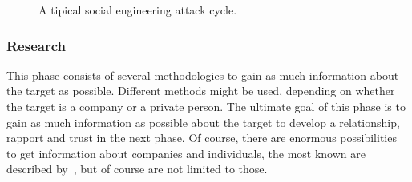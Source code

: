 \begin{figure}
  \begin{center}

    \caption{A tipical social engineering attack cycle.}
  \end{center}
\end{figure}

\subsubsection{Research}

This phase consists of several methodologies to gain as much information about
the target as possible. Different methods might be used, depending on whether
the target is a company or a private person. The ultimate goal of this phase is
to gain as much information as possible about the target to develop a
relationship, rapport and trust in the next phase. Of course, there are
enormous possibilities to get information about companies and individuals, the
most known are described by~\cite{jones2004,mitnick2003,thornburgh2004}, but of
course are not limited to those.

